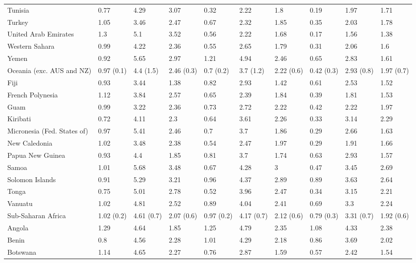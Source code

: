 \begin{longtable}[t]{llllllllll}
Tunisia & 0.77 & 4.29 & 3.07 & 0.32 & 2.22 & 1.8 & 0.19 & 1.97 & 1.71\\
Turkey & 1.05 & 3.46 & 2.47 & 0.67 & 2.32 & 1.85 & 0.35 & 2.03 & 1.78\\
United Arab Emirates & 1.3 & 5.1 & 3.52 & 0.56 & 2.22 & 1.68 & 0.17 & 1.56 & 1.38\\
Western Sahara & 0.99 & 4.22 & 2.36 & 0.55 & 2.65 & 1.79 & 0.31 & 2.06 & 1.6\\
\addlinespace
Yemen & 0.92 & 5.65 & 2.97 & 1.21 & 4.94 & 2.46 & 0.65 & 2.83 & 1.61\\
Oceania (exc. AUS and NZ) & 0.97 (0.1) & 4.4 (1.5) & 2.46 (0.3) & 0.7 (0.2) & 3.7 (1.2) & 2.22 (0.6) & 0.42 (0.3) & 2.93 (0.8) & 1.97 (0.7)\\
Fiji & 0.93 & 3.44 & 1.38 & 0.82 & 2.93 & 1.42 & 0.61 & 2.53 & 1.52\\
French Polynesia & 1.12 & 3.84 & 2.57 & 0.65 & 2.39 & 1.84 & 0.39 & 1.81 & 1.53\\
Guam & 0.99 & 3.22 & 2.36 & 0.73 & 2.72 & 2.22 & 0.42 & 2.22 & 1.97\\
\addlinespace
Kiribati & 0.72 & 4.11 & 2.3 & 0.64 & 3.61 & 2.26 & 0.33 & 3.14 & 2.29\\
Micronesia (Fed. States of) & 0.97 & 5.41 & 2.46 & 0.7 & 3.7 & 1.86 & 0.29 & 2.66 & 1.63\\
New Caledonia & 1.02 & 3.48 & 2.38 & 0.54 & 2.47 & 1.97 & 0.29 & 1.91 & 1.66\\
Papua New Guinea & 0.93 & 4.4 & 1.85 & 0.81 & 3.7 & 1.74 & 0.63 & 2.93 & 1.57\\
Samoa & 1.01 & 5.68 & 3.48 & 0.67 & 4.28 & 3 & 0.47 & 3.45 & 2.69\\
\addlinespace
Solomon Islands & 0.91 & 5.29 & 3.21 & 0.96 & 4.37 & 2.89 & 0.89 & 3.63 & 2.64\\
Tonga & 0.75 & 5.01 & 2.78 & 0.52 & 3.96 & 2.47 & 0.34 & 3.15 & 2.21\\
Vanuatu & 1.02 & 4.81 & 2.52 & 0.89 & 4.04 & 2.41 & 0.69 & 3.3 & 2.24\\
Sub-Saharan Africa & 1.02 (0.2) & 4.61 (0.7) & 2.07 (0.6) & 0.97 (0.2) & 4.17 (0.7) & 2.12 (0.6) & 0.79 (0.3) & 3.31 (0.7) & 1.92 (0.6)\\
Angola & 1.29 & 4.64 & 1.85 & 1.25 & 4.79 & 2.35 & 1.08 & 4.33 & 2.38\\
\addlinespace
Benin & 0.8 & 4.56 & 2.28 & 1.01 & 4.29 & 2.18 & 0.86 & 3.69 & 2.02\\
Botswana & 1.14 & 4.65 & 2.27 & 0.76 & 2.87 & 1.59 & 0.57 & 2.42 & 1.54\\

\end{longtable}
